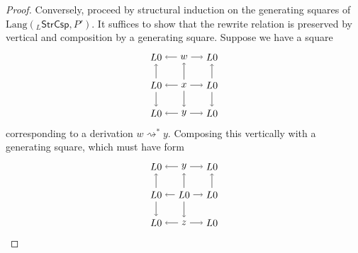 \documentclass{amsart}
\newcommand{\StrCsp}{\cat{StrCsp}}
\newcommand{\Lang}{\mathrm{Lang}}
\newcommand{\cat}[1]{\mathsf{#1}}
\newcommand{\deriv}[2]{#1 \rightsquigarrow^\ast #2}
\theoremstyle{remark}
\theoremstyle{definition}
\begin{document}
\begin{proof}
  Conversely, proceed by structural induction on the
  generating squares of $ \Lang ( _{L}\StrCsp , P' ) $.  It
  suffices to show that the rewrite relation is preserved by
  vertical and composition by a generating square.  Suppose
  we have a square
  \[
    \begin{tikzpicture}
      \node (1t) at (0,2) {$ L 0 $};
      \node (2t) at (1,2) {$ w $};
      \node (3t) at (2,2) {$ L 0 $};
      \node (1m) at (0,1) {$ L 0 $};
      \node (2m) at (1,1) {$ x $};
      \node (3m) at (2,1) {$ L 0 $};
      \node (1b) at (0,0) {$ L 0 $};
      \node (2b) at (1,0) {$ y $};
      \node (3b) at (2,0) {$ L 0 $};
      \draw [->] (2t) to node [] {\scriptsize{$  $}} (1t);
      \draw [->] (2t) to node [] {\scriptsize{$  $}} (3t);
      \draw [->] (2m) to node [] {\scriptsize{$  $}} (1m);
      \draw [->] (2m) to node [] {\scriptsize{$  $}} (3m);
      \draw [->] (2b) to node [] {\scriptsize{$  $}} (1b);
      \draw [->] (2b) to node [] {\scriptsize{$  $}} (3b);
      \draw [->] (1m) to node [] {\scriptsize{$  $}} (1t);
      \draw [->] (2m) to node [] {\scriptsize{$  $}} (2t);
      \draw [->] (3m) to node [] {\scriptsize{$  $}} (3t);
      \draw [->] (1m) to node [] {\scriptsize{$  $}} (1b);
      \draw [->] (2m) to node [] {\scriptsize{$  $}} (2b);
      \draw [->] (3m) to node [] {\scriptsize{$  $}} (3b);
    \end{tikzpicture}
  \]
  corresponding to a derivation $ \deriv{w}{y} $. Composing
  this vertically with a generating square, which must have
  form
  \[
    \begin{tikzpicture}
      \node (1t) at (0,2) {$ L 0 $};
      \node (2t) at (1,2) {$ y $};
      \node (3t) at (2,2) {$ L 0 $};
      \node (1m) at (0,1) {$ L 0 $};
      \node (2m) at (1,1) {$ L 0 $};
      \node (3m) at (2,1) {$ L 0 $};
      \node (1b) at (0,0) {$ L 0 $};
      \node (2b) at (1,0) {$ z $};
      \node (3b) at (2,0) {$ L 0 $};
      \draw [->] (2t) to node [] {\scriptsize{$  $}} (1t);
      \draw [->] (2t) to node [] {\scriptsize{$  $}} (3t);
      \draw [->] (2m) to node [] {\scriptsize{$  $}} (1m);
      \draw [->] (2m) to node [] {\scriptsize{$  $}} (3m);
      \draw [->] (2b) to node [] {\scriptsize{$  $}} (1b);
      \draw [->] (2b) to node [] {\scriptsize{$  $}} (3b);
      \draw [->] (1m) to node [] {\scriptsize{$  $}} (1t);
      \draw [->] (2m) to node [] {\scriptsize{$  $}} (2t);
      \draw [->] (3m) to node [] {\scriptsize{$  $}} (3t);
      \draw [->] (1m) to node [] {\scriptsize{$  $}} (1b);
      \draw [->] (2m) to node [] {\scriptsize{$  $}} (2b);

\end{tikzpicture}\]
\end{proof}
\end{document}
